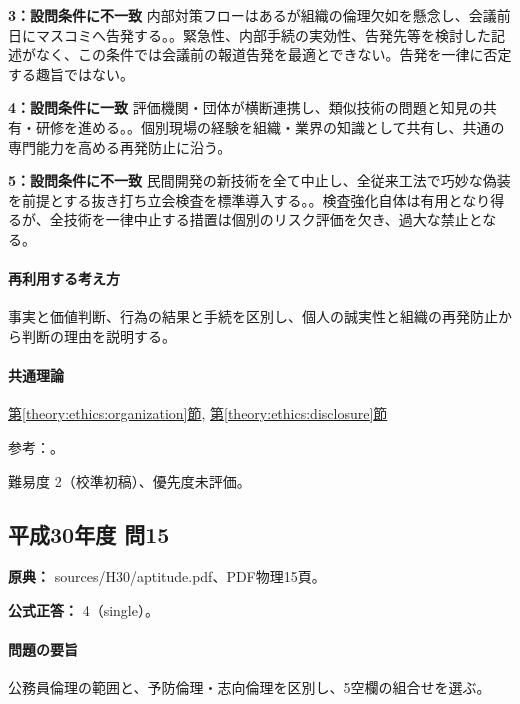 \noindent\textbf{3：設問条件に不一致} 内部対策フローはあるが組織の倫理欠如を懸念し、会議前日にマスコミへ告発する。。緊急性、内部手続の実効性、告発先等を検討した記述がなく、この条件では会議前の報道告発を最適とできない。告発を一律に否定する趣旨ではない。\par

\noindent\textbf{4：設問条件に一致} 評価機関・団体が横断連携し、類似技術の問題と知見の共有・研修を進める。。個別現場の経験を組織・業界の知識として共有し、共通の専門能力を高める再発防止に沿う。\par

\noindent\textbf{5：設問条件に不一致} 民間開発の新技術を全て中止し、全従来工法で巧妙な偽装を前提とする抜き打ち立会検査を標準導入する。。検査強化自体は有用となり得るが、全技術を一律中止する措置は個別のリスク評価を欠き、過大な禁止となる。\par

\paragraph{再利用する考え方} 事実と価値判断、行為の結果と手続を区別し、個人の誠実性と組織の再発防止から判断の理由を説明する。

\paragraph{共通理論} \hyperref[theory:ethics:organization]{第\ref*{theory:ethics:organization}節}, \hyperref[theory:ethics:disclosure]{第\ref*{theory:ethics:disclosure}節}

\par 参考：\cite{ipej_ethics2023,scj_code2013}。

\par 難易度 2（校準初稿）、優先度未評価。

\subsection{平成30年度 問15}
\label{q:h30-reg-apt-15}

\noindent\textbf{原典：} sources/H30/aptitude.pdf、PDF物理15頁。

\textbf{公式正答：} 4（single）。

\paragraph{問題の要旨} 公務員倫理の範囲と、予防倫理・志向倫理を区別し、5空欄の組合せを選ぶ。

